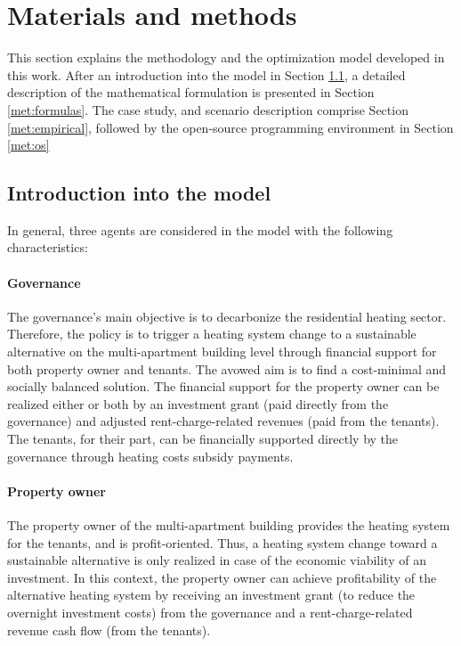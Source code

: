 \section{Materials and methods}\label{methodology}
This section explains the methodology and the optimization model developed in this work. After an introduction into the model in Section \ref{met:intro}, a detailed description of the mathematical formulation is presented in Section \ref{met:formulas}. The case study,  and scenario description comprise Section \ref{met:empirical}, followed by the open-source programming environment in Section \ref{met:os}

\subsection{Introduction into the model}\label{met:intro}
In general, three agents are considered in the model with the following characteristics:
\paragraph{Governance} The governance's main objective is to decarbonize the residential heating sector. Therefore, the policy is to trigger a heating system change to a sustainable alternative on the multi-apartment building level through financial support for both property owner and tenants. The avowed aim is to find a cost-minimal and socially balanced solution. The financial support for the property owner can be realized either or both by an investment grant (paid directly from the governance) and adjusted rent-charge-related revenues (paid from the tenants). The tenants, for their part, can be financially supported directly by the governance through heating costs subsidy payments. 
\paragraph{Property owner} The property owner of the multi-apartment building provides the heating system for the tenants, and is profit-oriented. Thus, a heating system change toward a sustainable alternative is only realized in case of the economic viability of an investment. In this context, the property owner can achieve profitability of the alternative heating system by receiving an investment grant (to reduce the overnight investment costs) from the governance and a rent-charge-related revenue cash flow (from the tenants). 
